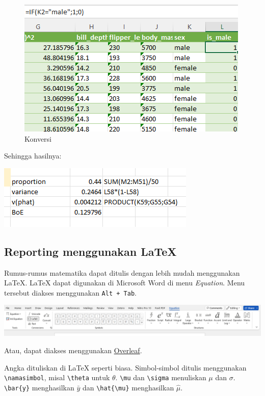 \documentclass[
  letterpaper,
  DIV=11,
  numbers=noendperiod]{scrreprt}
\begin{document}
\begin{figure}

{\centering \includegraphics{./count-10.png}

}

\caption{Konversi}

\end{figure}

Sehingga hasilnya:

\includegraphics{./count-11.png}

\hypertarget{reporting-menggunakan-latex}{%
\subsection{Reporting menggunakan
LaTeX}\label{reporting-menggunakan-latex}}

Rumus-rumus matematika dapat ditulis dengan lebih mudah menggunakan
LaTeX. LaTeX dapat digunakan di Microsoft Word di menu \emph{Equation}.
Menu tersebut diakses menggunakan \texttt{Alt\ +\ Tab}.

\includegraphics{./count-12.png}

Atau, dapat diakses menggunakan
\href{https://www.overleaf.com/}{Overleaf}.

Angka dituliskan di LaTeX seperti biasa. Simbol-simbol ditulis
menggunakan \texttt{\textbackslash{}namasimbol}, misal
\texttt{\textbackslash{}theta} untuk \(\theta\).
\texttt{\textbackslash{}mu} dan \texttt{\textbackslash{}sigma}
menuliskan \(\mu\) dan \(\sigma\). \texttt{\textbackslash{}bar\{y\}}
menghasilkan \(\bar{y}\) dan
\texttt{\textbackslash{}hat\{\textbackslash{}mu\}} menghasilkan
\(\hat{\mu}\).
\end{document}
